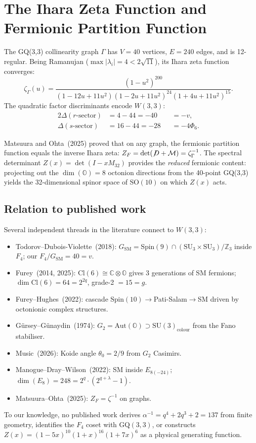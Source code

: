 \documentclass[12pt,a4paper]{article}
\theoremstyle{definition}
\newcommand{\GQ}{\mathrm{GQ}}
\newcommand{\SU}{\mathrm{SU}}
\newcommand{\SO}{\mathrm{SO}}
\newcommand{\Aut}{\mathrm{Aut}}
\newcommand{\Cl}{\mathrm{Cl}}
\newcommand{\Phisix}{\Phi_6}
\newcommand{\CC}{\mathbb{C}}
\newcommand{\OO}{\mathbb{O}}
\newcommand{\ZZ}{\mathbb{Z}}
\begin{document}
\section{The Ihara Zeta Function and Fermionic Partition Function}
\label{sec:ihara}

The GQ(3,3) collinearity graph $\Gamma$ has $V=40$ vertices,
$E=240$ edges, and is 12-regular.  Being Ramanujan
($\max|\lambda_i|=4<2\sqrt{11}$), its Ihara zeta function converges:
\begin{equation}
  \zeta_{\Gamma}(u) = \frac{(1-u^2)^{200}}
  {(1-12u+11u^2)(1-2u+11u^2)^{24}(1+4u+11u^2)^{15}}.
\end{equation}
The quadratic factor discriminants encode $W(3,3)$:
\begin{alignat}{2}
  \Delta(r\text{-sector}) &= 4-44 = -40 &&= -v,\\
  \Delta(s\text{-sector}) &= 16-44 = -28 &&= -4\Phisix.
\end{alignat}

Matsuura and Ohta~(2025) proved that on any graph, the fermionic
partition function equals the inverse Ihara zeta:
$Z_F = \det(\not\!D + \mathcal{M}) = \zeta_\Gamma^{-1}$.
The spectral determinant $Z(x)=\det(I-xM_{32})$ provides the
\emph{reduced} fermionic content: projecting out the $\dim(\OO)=8$
octonion directions from the 40-point GQ(3,3) yields the
32-dimensional spinor space of $\SO(10)$ on which $Z(x)$ acts.

\subsection{Relation to published work}

Several independent threads in the literature connect to $W(3,3)$:
\begin{itemize}[nosep]
\item Todorov--Dubois-Violette~(2018): $G_{\mathrm{SM}} = \mathrm{Spin}(9)\cap
  (\SU_3\times\SU_3)/\ZZ_3$ inside $F_4$; our $F_4/G_{\mathrm{SM}}=40=v$.
\item Furey~(2014, 2025): $\Cl(6)\cong\CC\otimes\OO$ gives 3 generations
  of SM fermions; $\dim\Cl(6)=64=2^{2q}$, grade-2 $=15=g$.
\item Furey--Hughes~(2022): cascade $\mathrm{Spin}(10)\to$Pati-Salam$\to$SM
  driven by octonionic complex structures.
\item G\"ursey--G\"unaydin~(1974): $G_2=\Aut(\OO)\supset\SU(3)_{\mathrm{colour}}$
  from the Fano stabiliser.
\item Music~(2026): Koide angle $\theta_0=2/9$ from $G_2$ Casimirs.
\item Manogue--Dray--Wilson~(2022): SM inside $E_{8(-24)}$;
  $\dim(E_8)=248=2^q\cdot(2^{q+\lambda}-1)$.
\item Matsuura--Ohta~(2025): $Z_F=\zeta^{-1}$ on graphs.
\end{itemize}
To our knowledge, no published work derives $\alpha^{-1}=q^4+2q^3+2=137$
from finite geometry, identifies the $F_4$ coset with $\GQ(3,3)$,
or constructs $Z(x)=(1-5x)^{10}(1+x)^{16}(1+7x)^6$ as a
physical generating function.
\end{document}

